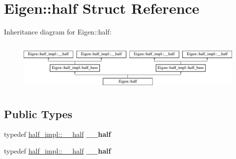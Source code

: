 \hypertarget{struct_eigen_1_1half}{}\section{Eigen\+:\+:half Struct Reference}
\label{struct_eigen_1_1half}
Inheritance diagram for Eigen\+:\+:half\+:\begin{figure}[H]
\begin{center}
\leavevmode
\includegraphics[height=2.485207cm]{struct_eigen_1_1half}
\end{center}
\end{figure}
\subsection*{Public Types}
\begin{DoxyCompactItemize}
\item 
\mbox{\label{struct_eigen_1_1half_a2c7aad658758178b8836faddd9cebd72}} 
typedef \hyperlink{struct_eigen_1_1half__impl_1_1____half}{half\+\_\+impl\+::\+\_\+\+\_\+half} {\bfseries \+\_\+\+\_\+half}
\item 
\mbox{\label{struct_eigen_1_1half_a2c7aad658758178b8836faddd9cebd72}} 
typedef \hyperlink{struct_eigen_1_1half__impl_1_1____half}{half\+\_\+impl\+::\+\_\+\+\_\+half} {\bfseries \+\_\+\+\_\+half}
\end{DoxyCompactItemize}
